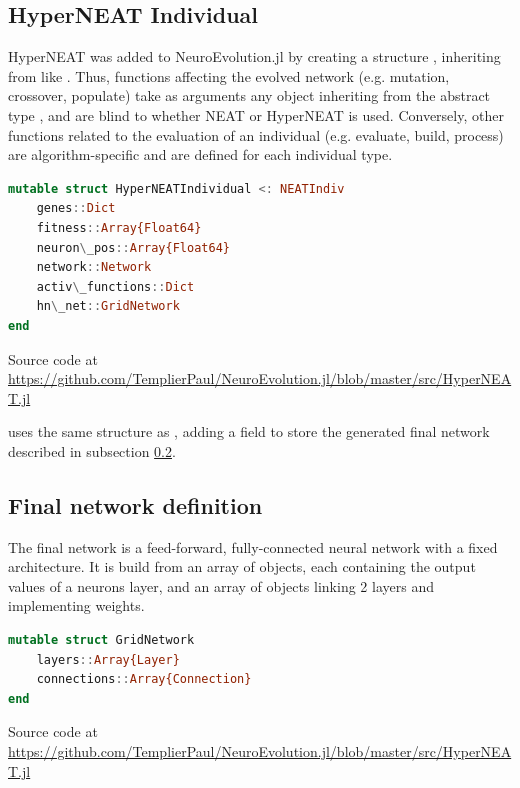 \subsection{HyperNEAT Individual}

HyperNEAT was added to NeuroEvolution.jl by creating a structure , inheriting from  like . Thus, functions affecting the evolved network (e.g. mutation, crossover, populate) take as arguments any object inheriting from the abstract type , and are blind to whether NEAT or HyperNEAT is used. Conversely, other functions related to the evaluation of an individual (e.g. evaluate, build, process) are algorithm-specific and are defined for each individual type.

\begin{minipage}{\linewidth}
\begin{lstlisting}[language=Julia, caption=HyperNEAT Individual]
mutable struct HyperNEATIndividual <: NEATIndiv
    genes::Dict
    fitness::Array{Float64}
    neuron\_pos::Array{Float64}
    network::Network
    activ\_functions::Dict
    hn\_net::GridNetwork
end
\end{lstlisting}
Source code at \url{https://github.com/TemplierPaul/NeuroEvolution.jl/blob/master/src/HyperNEAT.jl}\\
\end{minipage}

 uses the same structure as , adding a  field to store the generated final network described in subsection \ref{sub:final-hn-net}.

\subsection{Final network definition}
\label{sub:final-hn-net}
The final network is a feed-forward, fully-connected neural network with a fixed architecture. It is build from an array of  objects, each containing the output values of a neurons layer, and an array of  objects linking 2 layers and implementing weights. 

\begin{minipage}{\linewidth}
\begin{lstlisting}[language=Julia, caption=HyperNEAT final network]
mutable struct GridNetwork
    layers::Array{Layer}
    connections::Array{Connection}
end
\end{lstlisting}
Source code at \url{https://github.com/TemplierPaul/NeuroEvolution.jl/blob/master/src/HyperNEAT.jl}\\
\end{minipage}

